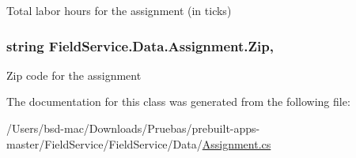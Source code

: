 Total labor hours for the assignment (in ticks) 

\hypertarget{class_field_service_1_1_data_1_1_assignment_ab8434715ad43a721ed1b7b53b9faeca1}{
\subsubsection[{Zip}]{\setlength{\rightskip}{0pt plus 5cm}string Field\+Service.\+Data.\+Assignment.\+Zip\hspace{0.3cm}{\ttfamily [get]}, {\ttfamily [set]}}}\label{class_field_service_1_1_data_1_1_assignment_ab8434715ad43a721ed1b7b53b9faeca1}


Zip code for the assignment 



The documentation for this class was generated from the following file\+:\begin{DoxyCompactItemize}
\item 
/\+Users/bsd-\/mac/\+Downloads/\+Pruebas/prebuilt-\/apps-\/master/\+Field\+Service/\+Field\+Service/\+Data/\hyperlink{_assignment_8cs}{Assignment.\+cs}\end{DoxyCompactItemize}
